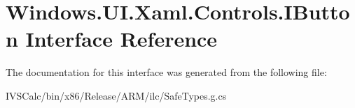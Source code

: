\hypertarget{interface_windows_1_1_u_i_1_1_xaml_1_1_controls_1_1_i_button}{}\section{Windows.\+U\+I.\+Xaml.\+Controls.\+I\+Button Interface Reference}
\label{interface_windows_1_1_u_i_1_1_xaml_1_1_controls_1_1_i_button}


The documentation for this interface was generated from the following file\+:\begin{DoxyCompactItemize}
\item 
I\+V\+S\+Calc/bin/x86/\+Release/\+A\+R\+M/ilc/Safe\+Types.\+g.\+cs\end{DoxyCompactItemize}

